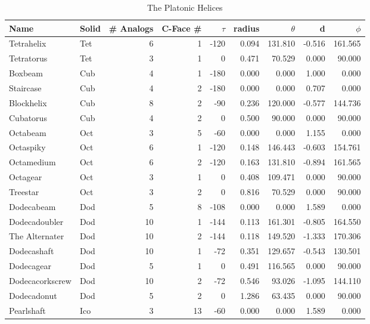 \documentclass{svproc}
\begin{document}
\begin{table}[ht]
\caption{The Platonic Helices} %
\centering %
\begin{tabular}{l l r r r r r r r}
  \hline\hline %
  Name & Solid & \# Analogs & C-Face \# & $ \tau $ & radius & $ \theta $ & d & $ \phi $ \\ [0.5ex] %
  \hline %
Tetrahelix & Tet &	6 &	1 &	-120 &	0.094 &	131.810	& -0.516 & 161.565 \\
Tetratorus & Tet & 	3 &	1 &	0    &	0.471 &	70.529	& 0.000	& 90.000 \\
\hline %
Boxbeam & Cub &	4 &	1 &	-180 &	0.000 &	0.000 &	1.000 &	0.000 \\
Staircase & Cub &	4 & 	2 &	-180 &	0.000 &	0.000 &	0.707 &	0.000 \\
Blockhelix & Cub & 	8 & 	2 & 	-90  &	0.236 &	120.000 & -0.577 & 144.736 \\
Cubatorus & Cub &	4 &	2 &	0 &	0.500 &	90.000 & 0.000 & 90.000 \\
\hline %
Octabeam & Oct &	3 &	5 &	-60 &	0.000 &	0.000 &	1.155 &	0.000 \\
Octaspiky & Oct &	6 &	1 &	-120 &	0.148 &	146.443 & -0.603 & 154.761 \\
Octamedium & Oct &	6 &	2 &	-120 &	0.163 &	131.810 & -0.894 & 161.565 \\
Octagear & Oct &	3 &	1 &	0 &	0.408 &	109.471 & 0.000	& 90.000 \\
Treestar & Oct &	3 &	2 &	0 &	0.816 &	70.529 & 0.000 & 90.000 \\
\hline %
Dodecabeam & Dod &	5 &	8 &	-108 &	0.000 &	0.000 &	1.589 &	0.000 \\
Dodecadoubler & Dod &	10 &	1 &	-144 &	0.113 &	161.301 &-0.805 & 164.550 \\
The Alternater & Dod &	10 &	2 &	-144 &	0.118 &	149.520 &-1.333	& 170.306 \\
Dodecashaft & Dod &	10 &	1 &	-72 &	0.351 &	129.657	&-0.543 & 130.501 \\
Dodecagear & Dod &	5 &	1 &	0 &	0.491 &	116.565	& 0.000	& 90.000 \\
Dodecacorkscrew & Dod &	10 &	2 &	-72 &	0.546 &	93.026 & -1.095 & 144.110 \\
Dodecadonut & Dod &	5 &	2 &	0 &	1.286 &	63.435 & 0.000 & 90.000 \\
\hline %
Pearlshaft & Ico &	3 &	13 &	-60 &	0.000 &	0.000 &	1.589 & 0.000 \\

\end{tabular}
\end{table}
\end{document}
